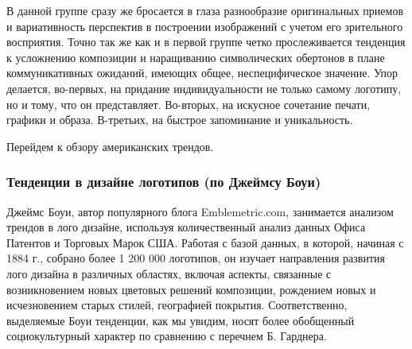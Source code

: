 В данной группе сразу же бросается в глаза разнообразие оригинальных приемов и вариативность
перспектив в построении изображений с учетом его зрительного восприятия. Точно так же как и в первой
группе четко прослеживается тенденция к усложнению композиции и наращиванию символических обертонов
в плане коммуникативных ожиданий, имеющих общее, неспецифическое значение. Упор делается, во-первых,
на придание индивидуальности не только самому логотипу, но и тому, что он представляет. Во-вторых,
на искусное сочетание печати, графики и образа. В-третьих, на быстрое запоминание и уникальность.

Перейдем к обзору американских трендов.

\subsubsection{Тенденции в дизайне логотипов (по Джеймсу Боуи)}

Джеймс Боуи, автор популярного блога Emblemetric.com, занимается анализом трендов в лого дизайне,
используя  количественный анализ данных Офиса Патентов и Торговых Марок США. Работая с базой данных,
в которой,  начиная с 1884 г., собрано более 1 200 000 логотипов, он изучает  направления развития
лого дизайна в различных областях, включая аспекты, связанные с возникновением новых цветовых
решений композиции, рождением новых и исчезновением старых стилей, географией
покрытия. Соответственно, выделяемые Боуи тенденции, как мы увидим, носят более обобщенный
социокультурный характер по сравнению с перечнем Б. Гарднера.

